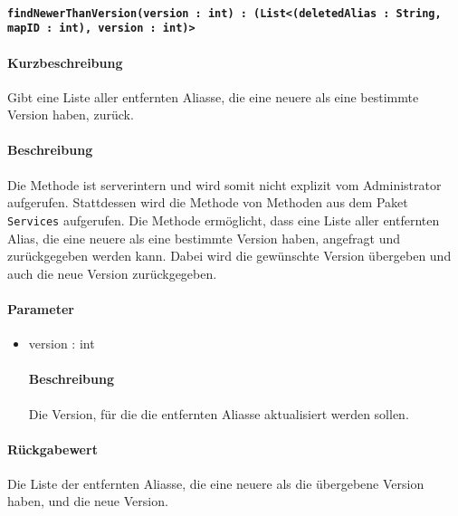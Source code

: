 \paragraph{\texttt{findNewerThanVersion(version : int) : (List<(deletedAlias : String, mapID : int), version : int)>}}%
\paragraph*{Kurzbeschreibung}
Gibt eine Liste aller entfernten Aliasse, die eine neuere als eine bestimmte Version haben, zurück.
\paragraph*{Beschreibung}
Die Methode ist serverintern und wird somit nicht explizit vom Administrator aufgerufen.
Stattdessen wird die Methode von Methoden aus dem Paket \texttt{Services} aufgerufen.
Die Methode ermöglicht, dass eine Liste aller entfernten Alias, die eine neuere als eine bestimmte Version haben, angefragt und zurückgegeben werden kann.
Dabei wird die gewünschte Version übergeben und auch die neue Version zurückgegeben.
\paragraph*{Parameter}
\begin{itemize}
    \item version : int
    		\paragraph*{Beschreibung}
    		Die Version, für die die entfernten Aliasse aktualisiert werden sollen.
\end{itemize}
\paragraph*{Rückgabewert}
Die Liste der entfernten Aliasse, die eine neuere als die übergebene Version haben, und die neue Version.
